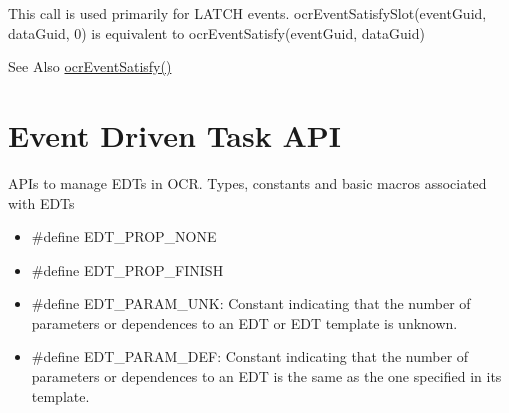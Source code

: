 \descr
This call is used primarily for L\-A\-T\-C\-H events. ocr\-Event\-Satisfy\-Slot(event\-Guid, data\-Guid, 0) is
equivalent to ocr\-Event\-Satisfy(event\-Guid, data\-Guid)

\begin{DoxySeeAlso}{See Also}
\hyperlink{group__OCREvents_gab27ef5d905c01ba534e86f8e7e91eaf0}{ocr\-Event\-Satisfy()}
\end{DoxySeeAlso}



\hypertarget{group__OCREDT}{\section{Event Driven Task A\-P\-I}
\label{group__OCREDT}
}


A\-P\-Is to manage E\-D\-Ts in O\-C\-R.
Types, constants and basic macros associated with EDTs
\begin{itemize}
\item \#define EDT\_PROP\_NONE
\item \#define EDT\_PROP\_FINISH
\item \#define EDT\_PARAM\_UNK: Constant indicating that the number of parameters or dependences to an EDT or EDT template is
unknown.
\item \#define EDT\_PARAM\_DEF: Constant indicating that the number of parameters or dependences to an EDT is the same as the one
specified in its template.
\end{itemize}

